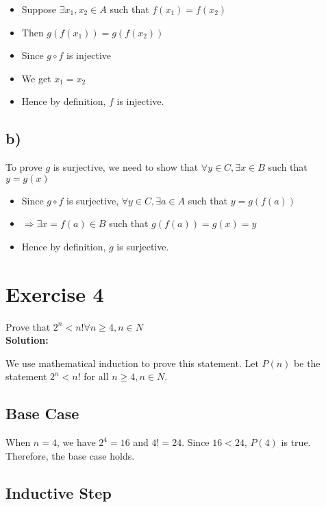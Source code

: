 \documentclass{article}
\begin{document}
\begin{itemize}
    \item Suppose $\exists x_1, x_2 \in A$ such that $f(x_1) = f(x_2)$
    \item Then $g(f(x_1)) = g(f(x_2))$
    \item Since $g \circ f$ is injective
    \item We get $x_1 = x_2$
    \item Hence by definition, $f$ is injective.
\end{itemize}    

\subsection*{b)}

To prove $g$ is surjective, we need to show that $\forall y \in C, \exists x \in B$ such that $y = g(x)$

\begin{itemize}
    \item Since $g \circ f$ is surjective, $\forall y \in C, \exists a \in A$ such that $y = g(f(a))$
    \item $\Rightarrow \exists x = f(a) \in B$ such that $g(f(a)) = g(x) = y$
    \item Hence by definition, $g$ is surjective.
\end{itemize}

\newpage

\section*{Exercise 4}

Prove that $2^n < n! \forall n \geq 4, n \in N$ \\

\textbf{Solution:}

We use mathematical induction to prove this statement. Let $P(n)$ be the statement $2^n < n!$ for all $n \geq 4, n \in N$.

\subsection*{Base Case}

When $n = 4$, we have $2^4 = 16$ and $4! = 24$. Since $16 < 24$, $P(4)$ is true. Therefore, the base case holds.

\subsection*{Inductive Step}
\end{document}
